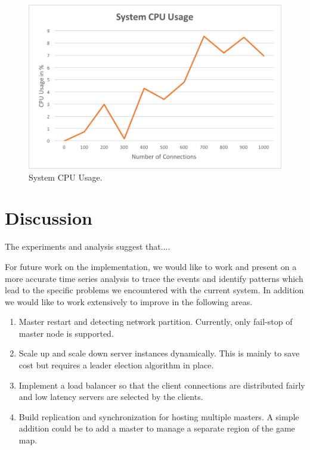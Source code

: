 \documentclass[a4paper]{IEEEtran}
\begin{document}
    \begin{figure}[tbp]
    \centering
      \includegraphics[width=\columnwidth]{CPUUsage.png}
    \caption{System CPU Usage.}
    \label{fig:cpu_usage}
  \end{figure}
  
  \section{Discussion}
  
  \label{sec:discussion}
  
  The experiments and analysis suggest that....
  
  For future work on the implementation, we would like to work and present on a more accurate time
  series analysis to trace the events and identify patterns which lead to the specific problems
  we encountered with the current system. In addition we would like to work extensively to improve in the following areas.
  
  \begin{enumerate}
    \item Master restart and detecting network partition. Currently, only fail-stop of master node is supported.
    \item Scale up and scale down server instances dynamically. This is mainly to save cost but requires a leader election algorithm in place.
    \item Implement a load balancer so that the client connections are distributed fairly and low latency servers are selected by the clients. 
    \item Build replication and synchronization for hosting multiple masters. A simple addition could be to add a master to manage a separate region of the game map.
  \end{enumerate}
  
\end{document}
